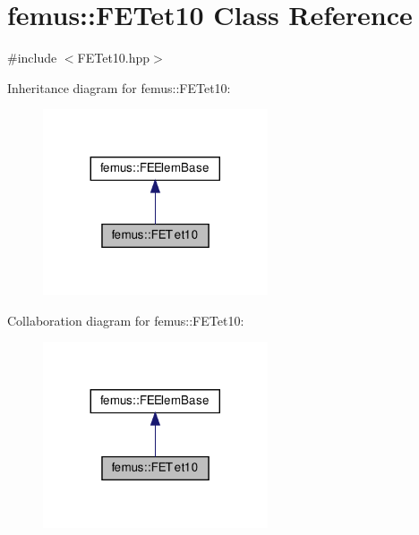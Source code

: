 \hypertarget{classfemus_1_1_f_e_tet10}{}\section{femus\+:\+:F\+E\+Tet10 Class Reference}
\label{classfemus_1_1_f_e_tet10}


{\ttfamily \#include $<$F\+E\+Tet10.\+hpp$>$}



Inheritance diagram for femus\+:\+:F\+E\+Tet10\+:
\nopagebreak
\begin{figure}[H]
\begin{center}
\leavevmode
\includegraphics[width=188pt]{classfemus_1_1_f_e_tet10__inherit__graph}
\end{center}
\end{figure}


Collaboration diagram for femus\+:\+:F\+E\+Tet10\+:
\nopagebreak
\begin{figure}[H]
\begin{center}
\leavevmode
\includegraphics[width=188pt]{classfemus_1_1_f_e_tet10__coll__graph}
\end{center}
\end{figure}
